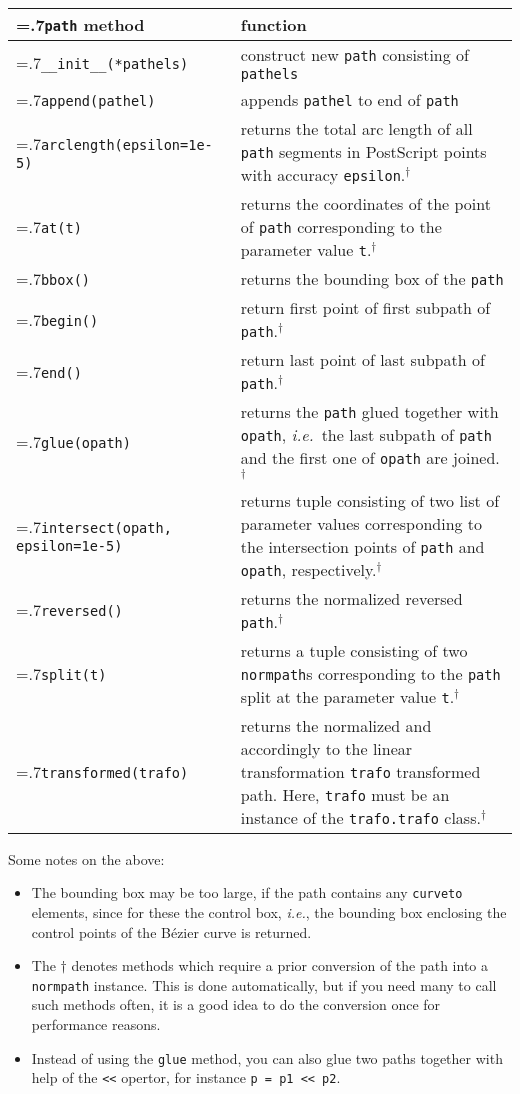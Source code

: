 \medskip
\begin{tabularx}{\linewidth}{>{\hsize=.7\hsize}X>{\raggedright\arraybackslash\hsize=1.3\hsize}X}
  \texttt{path} method & function \\
  \hline \texttt{\_\_init\_\_(*pathels)} & construct new \texttt{path}
  consisting of \texttt{pathels}\\
  \texttt{append(pathel)} & appends \texttt{pathel} to end of \texttt{path}\\
  \texttt{arclength(epsilon=1e-5)} & returns the total arc length of
  all \texttt{path} segments in PostScript points with accuracy
  \texttt{epsilon}.$^\dagger$\\
  \texttt{at(t)} & returns the coordinates of the point of
  \texttt{path} corresponding to the parameter value
  \texttt{t}.$^\dagger$\\
  \texttt{bbox()} & returns the bounding box of the \texttt{path}\\
  \texttt{begin()} & return first point of first subpath of
  \texttt{path}.$^\dagger$\\
  \texttt{end()} & return last point of last subpath of
  \texttt{path}.$^\dagger$\\
  \texttt{glue(opath)} & returns the \texttt{path} glued together with
  \texttt{opath}, \textit{i.e.}\ the last subpath of \texttt{path}
  and the first one of \texttt{opath} are joined.$^\dagger$\\
  \texttt{intersect(opath, \newline\phantom{intersect(}epsilon=1e-5)}
  & returns tuple consisting of two list of parameter values
  corresponding to the
  intersection points of \texttt{path} and \texttt{opath}, respectively.$^\dagger$\\
  \texttt{reversed()} & returns the normalized reversed
  \texttt{path}.$^\dagger$\\
  \texttt{split(t)} & returns a tuple consisting of two
  \texttt{normpath}s corresponding to the \texttt{path} split at
  the parameter value \texttt{t}.$^\dagger$\\
  \texttt{transformed(trafo)} & returns the normalized and accordingly
  to the linear transformation \texttt{trafo} transformed path. Here,
  \texttt{trafo} must be an instance of the \texttt{trafo.trafo}
  class.$^\dagger$
\end{tabularx} 
\medskip

Some notes on the above:
\begin{itemize}
\item The bounding box may be too large, if the path contains any
  \texttt{curveto} elements, since for these the control box,
  \textit{i.e.}, the bounding box enclosing the control points of
  the B\'ezier curve is returned.
\item The $\dagger$ denotes methods which require a prior
  conversion of the path into a \verb|normpath| instance. This is
  done automatically, but if you need many to call such methods often,
  it is a good idea to do the conversion once for performance reasons.
\item Instead of using the \verb|glue| method, you can also glue two
paths together with help of the \verb|<<| opertor, for instance
\verb|p = p1 << p2|.
\end{itemize}

